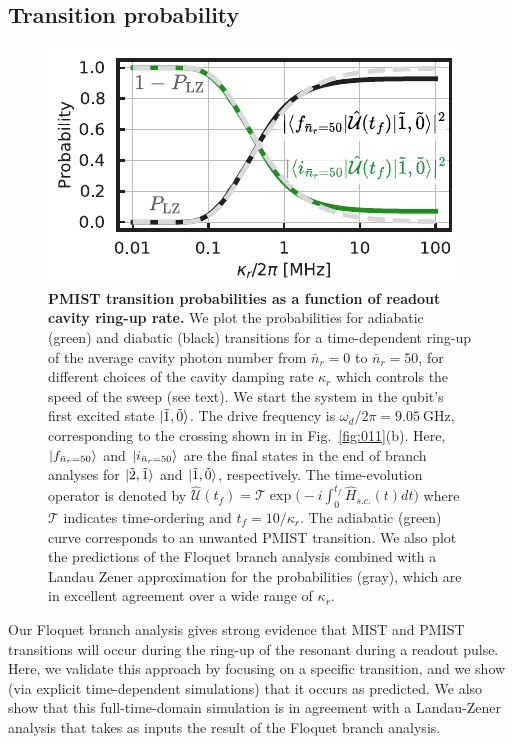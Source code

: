 \documentclass[%
reprint,
superscriptaddress,
 amsmath,amssymb,
 aps,
 prx,
longbibliography,
floatfix,
]{revtex4-2}
\begin{document}
\subsection{Transition probability}\label{sec:LZ}
\begin{figure}[t]
    \centering
    \includegraphics[width=\linewidth]{Figures/LZ.pdf}
    \caption{
    {\bf PMIST transition probabilities as a function of readout cavity ring-up rate.}
    We plot the probabilities for adiabatic (green) and diabatic (black) transitions for a time-dependent ring-up of the average cavity photon number from $\bar{n}_r = 0$ to $\bar{n}_r = 50$, for different choices of the cavity damping rate $\kappa_r$ which controls the speed of the sweep (see text).  We start the system in the qubit's first excited state $\ket{\tilde{1},\tilde{0}}$.  The drive frequency is $\omega_d/2\pi=9.05 \ \mathrm{GHz}$, corresponding to the crossing shown in in Fig.~\ref{fig:011}(b).
    Here, $\ket{f_{\bar n_r=50}}$ and $\ket{i_{\bar n_r=50}}$ are the final states in the end of branch analyses for $\ket{\tilde{2},\tilde{1}}$ and $\ket{\tilde{1},\tilde{0}}$, respectively. The time-evolution operator is denoted by $ \hat{\mathcal{U}}(t_f)=\mathcal{T}\exp\big(-i\int^{t_f}_{0} \hat H_{s.c.}(t)dt\big)$ where $\mathcal{T}$ indicates time-ordering and $t_f=10/\kappa_r$. The adiabatic (green) curve corresponds to an unwanted PMIST transition.  We also plot the predictions of the Floquet branch analysis combined with a Landau Zener approximation for the probabilities (gray), which are in excellent agreement over a wide range of $\kappa_r$.}
    \label{fig:LZ}
\end{figure}

Our Floquet branch analysis gives strong evidence that MIST and PMIST transitions will occur during the ring-up of the resonant during a readout pulse.  Here, we validate this approach by focusing on a specific transition, and we show (via explicit time-dependent simulations) that it occurs as predicted.  We also show that this full-time-domain simulation is in agreement with a Landau-Zener analysis that takes as inputs the result of the Floquet branch analysis.    
\end{document}
